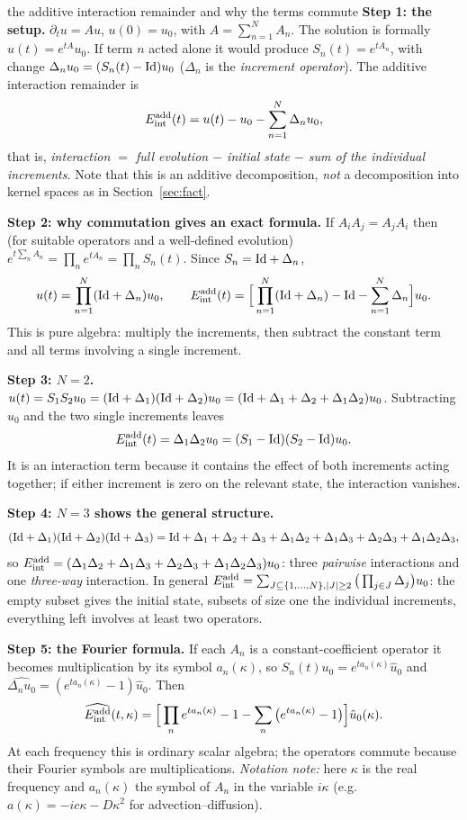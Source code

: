 \begin{explained}{the additive interaction remainder and why the terms commute}
\textbf{Step 1: the setup.} $\partial_tu=Au$, $u(0)=u_0$, with $A=\sum_{n=1}^NA_n$. The solution is formally $u(t)=e^{tA}u_0$. If term $n$ acted alone it would produce $S_n(t)=e^{tA_n}$, with change $\Delta_nu_0=(S_n(t)-\mathrm{Id})u_0$ ($\Delta_n$ is the \emph{increment operator}). The additive interaction remainder is
\[
E_{\mathrm{int}}^{\mathrm{add}}(t)=u(t)-u_0-\sum_{n=1}^N\Delta_nu_0,
\]
that is, \emph{interaction $=$ full evolution $-$ initial state $-$ sum of the individual increments.}
Note that this is an additive decomposition, \emph{not} a decomposition into kernel spaces as in Section~\ref{sec:fact}.

\medskip\textbf{Step 2: why commutation gives an exact formula.} If $A_iA_j=A_jA_i$ then (for suitable operators and a well-defined evolution) $e^{t\sum_nA_n}=\prod_ne^{tA_n}=\prod_nS_n(t)$. Since $S_n=\mathrm{Id}+\Delta_n$,
\[
u(t)=\prod_{n=1}^N(\mathrm{Id}+\Delta_n)u_0,\qquad
E_{\mathrm{int}}^{\mathrm{add}}(t)=\Big[\prod_{n=1}^N(\mathrm{Id}+\Delta_n)-\mathrm{Id}-\sum_{n=1}^N\Delta_n\Big]u_0 .
\]
This is pure algebra: multiply the increments, then subtract the constant term and all terms involving a single increment.

\medskip\textbf{Step 3: $N=2$.} $u(t)=S_1S_2u_0=(\mathrm{Id}+\Delta_1)(\mathrm{Id}+\Delta_2)u_0=(\mathrm{Id}+\Delta_1+\Delta_2+\Delta_1\Delta_2)u_0$. Subtracting $u_0$ and the two single increments leaves
\[
E_{\mathrm{int}}^{\mathrm{add}}(t)=\Delta_1\Delta_2u_0=(S_1-\mathrm{Id})(S_2-\mathrm{Id})u_0 .
\]
It is an interaction term because it contains the effect of both increments acting together; if either increment is zero on the relevant state, the interaction vanishes.

\medskip\textbf{Step 4: $N=3$ shows the general structure.}
\[
(\mathrm{Id}+\Delta_1)(\mathrm{Id}+\Delta_2)(\mathrm{Id}+\Delta_3)=\mathrm{Id}+\Delta_1+\Delta_2+\Delta_3+\Delta_1\Delta_2+\Delta_1\Delta_3+\Delta_2\Delta_3+\Delta_1\Delta_2\Delta_3,
\]
so $E_{\mathrm{int}}^{\mathrm{add}}=(\Delta_1\Delta_2+\Delta_1\Delta_3+\Delta_2\Delta_3+\Delta_1\Delta_2\Delta_3)u_0$: three \emph{pairwise} interactions and one \emph{three-way} interaction. In general $E_{\mathrm{int}}^{\mathrm{add}}=\sum_{J\subseteq\{1,\dots,N\},|J|\ge2}\big(\prod_{j\in J}\Delta_j\big)u_0$: the empty subset gives the initial state, subsets of size one the individual increments, everything left involves at least two operators.

\medskip\textbf{Step 5: the Fourier formula.} If each $A_n$ is a constant-coefficient operator it becomes multiplication by its symbol $a_n(\kappa)$, so $\widehat{S_n(t)u_0}=e^{ta_n(\kappa)}\hat u_0$ and $\widehat{\Delta_nu_0}=(e^{ta_n(\kappa)}-1)\hat u_0$. Then
\[
\widehat{E_{\mathrm{int}}^{\mathrm{add}}}(t,\kappa)=\Big[\prod_ne^{ta_n(\kappa)}-1-\sum_n\big(e^{ta_n(\kappa)}-1\big)\Big]\hat u_0(\kappa).
\]
At each frequency this is ordinary scalar algebra; the operators commute because their Fourier symbols are multiplications. \emph{Notation note:} here $\kappa$ is the real frequency and $a_n(\kappa)$ the symbol of $A_n$ in the variable $i\kappa$ (e.g.\ $a(\kappa)=-ic\kappa-D\kappa^2$ for advection--diffusion).


\end{explained}
